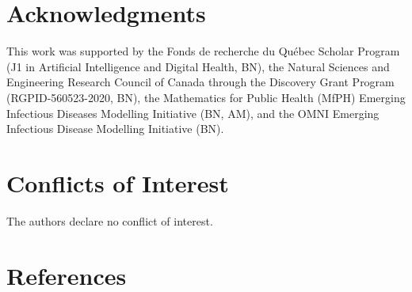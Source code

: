 \documentclass[
]{article}
\begin{document}
\hypertarget{acknowledgments}{%
\section{Acknowledgments}\label{acknowledgments}}

This work was supported by the Fonds de recherche du Québec Scholar
Program (J1 in Artificial Intelligence and Digital Health, BN), the
Natural Sciences and Engineering Research Council of Canada through the
Discovery Grant Program (RGPID-560523-2020, BN), the Mathematics for
Public Health (MfPH) Emerging Infectious Diseases Modelling Initiative
(BN, AM), and the OMNI Emerging Infectious Disease Modelling Initiative
(BN).

\hypertarget{conflicts-of-interest}{%
\section{Conflicts of Interest}\label{conflicts-of-interest}}

The authors declare no conflict of interest.

\hypertarget{references}{%
\section{References}\label{references}}
\end{document}

